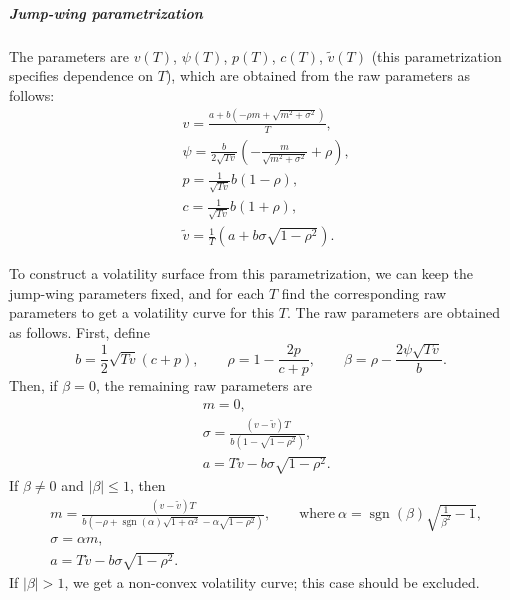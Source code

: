 \documentclass[a4paper,11pt,titlepage]{article}
\DeclareMathOperator{\sgn}{sgn}
\renewcommand{\tilde}{\widetilde}
\theoremstyle{remark}
\begin{document}
\subparagraph{Jump-wing parametrization} The parameters are $v(T)$, $\psi(T)$,
$p(T)$, $c(T)$, $\tilde v(T)$ (this parametrization specifies dependence on
$T$), which are obtained from the raw parameters as follows:
\begin{align*}
&v = \frac{a + b(-\rho m + \sqrt{m^2+\sigma^2})}{T},\\
&\psi = \frac{b}{2\sqrt{Tv}} 
  \left( -\frac{m}{\sqrt{m^2 + \sigma^2}} + \rho\right),\\
&p = \frac{1}{\sqrt{Tv}} b(1-\rho),\\
&c = \frac{1}{\sqrt{Tv}} b(1+\rho),\\
&\tilde v = \frac1T \left( a + b\sigma\sqrt{1-\rho^2} \right).
\end{align*}

To construct a volatility surface from this parametrization, we can keep the
jump-wing parameters fixed, and for each $T$ find the corresponding raw
parameters to get a volatility curve for this $T$. The raw parameters are
obtained as follows. First, define
\[
b     = \frac12 \sqrt{Tv}(c+p), \qquad
\rho  = 1 - \frac{2p}{c+p}, \qquad
\beta = \rho - \frac{2\psi\sqrt{Tv}}{b}.
\]
Then, if $\beta=0$, the remaining raw parameters are
\begin{align*}
&m      = 0,\\
&\sigma = \frac{(v-\tilde v)T}{b(1-\sqrt{1-\rho^2})},\\
&a      = T\tilde v - b\sigma\sqrt{1-\rho^2}.
\end{align*}
If $\beta\neq 0$ and $|\beta|\le 1$, then
\begin{align*}
&m = \frac{(v-\tilde v)T}
          {b(-\rho+\sgn(\alpha)\sqrt{1+\alpha^2} - \alpha\sqrt{1-\rho^2})},
  \qquad\text{where}\ \alpha = \sgn(\beta)\sqrt{\frac1{\beta^2} - 1},\\
&\sigma = \alpha m,\\
&a = T\tilde v - b\sigma\sqrt{1-\rho^2}.
\end{align*}
If $|\beta|>1$, we get a non-convex volatility curve; this case should be
excluded.
\end{document}
